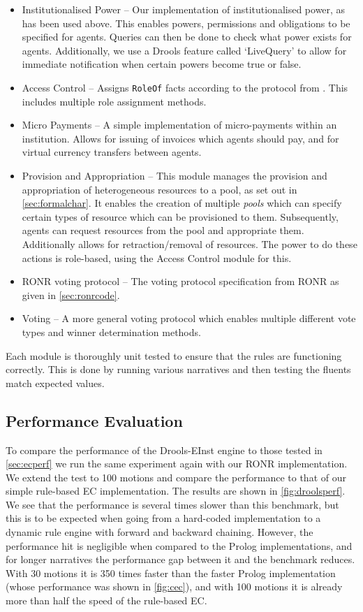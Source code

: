 \begin{itemize}
\item Institutionalised Power -- Our implementation of institutionalised power, as has been used above. This enables powers, permissions and obligations to be specified for agents. Queries can then be done to check what power exists for agents. Additionally, we use a Drools feature called `LiveQuery' to allow for immediate notification when certain powers become true or false.
\item Access Control -- Assigns \texttt{RoleOf} facts according to the protocol from \citet{Pitt2012b}. This includes multiple role assignment methods.
\item Micro Payments -- A simple implementation of micro-payments within an institution. Allows for issuing of invoices which agents should pay, and for virtual currency transfers between agents.
\item Provision and Appropriation -- This module manages the provision and appropriation of heterogeneous resources to a pool, as set out in \autoref{sec:formalchar}. It enables the creation of multiple \emph{pools} which can specify certain types of resource which can be provisioned to them. Subsequently, agents can request resources from the pool and appropriate them. Additionally allows for retraction/removal of resources. The power to do these actions is role-based, using the Access Control module for this.
\item \ac{RONR} voting protocol -- The voting protocol specification from \ac{RONR} as given in \autoref{sec:ronrcode}.
\item Voting -- A more general voting protocol which enables multiple different vote types and winner determination methods.
\end{itemize}

Each module is thoroughly unit tested to ensure that the rules are functioning
correctly. This is done by running various narratives and then testing the
fluents match expected values.

\subsection{Performance Evaluation}

To compare the performance of the Drools-EInst engine to those tested in
\autoref{sec:ecperf} we run the same experiment again with our \ac{RONR}
implementation. We extend the test to 100 motions and compare the performance
to that of our simple rule-based \ac{EC} implementation. The results are shown
in \autoref{fig:droolsperf}. We see that the performance is several times
slower than this benchmark, but this is to be expected when going from a 
hard-coded implementation to a dynamic rule engine with forward and backward
chaining. However, the performance hit is negligible when compared to the
Prolog implementations, and for longer narratives the performance gap between it and the
benchmark reduces. With 30 motions it is 350 times faster than the faster
Prolog implementation (whose performance was shown in \autoref{fig:cec}), and with 100 motions it is already more than half the
speed of the rule-based \ac{EC}.

